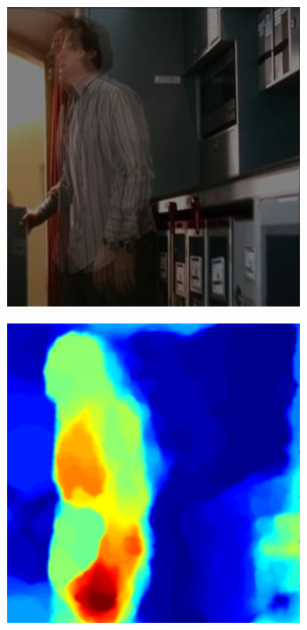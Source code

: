 \begin{figure}[ht]
\begin{subfigure}{0.23\textwidth}
                \includegraphics[width=\textwidth]{figures_3_video_body_tracking/w.png}
                \caption{\footnotesize }
                \label{fig:w_avg}
        \end{subfigure}
        \begin{subfigure}{0.23\textwidth}
                \centering
                \includegraphics[width=\textwidth]{figures_3_video_body_tracking/w_mag.png}

\end{subfigure}
\end{figure}
